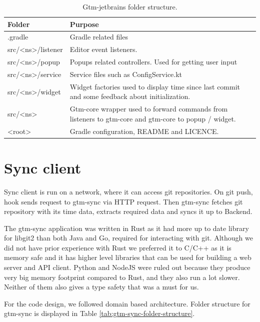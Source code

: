 \begin{table}[h]
    \centering
    \begin{tabular}{ | p{3cm} | p{10cm} |}
        \hline
        Folder & Purpose\\
        \hline
        .gradle & Gradle related files\\
        \hline
        src/<ns>/listener & Editor event listeners.\\
        \hline
        src/<ns>/popup & Popups related controllers.
        Used for getting user input\\
        \hline
        src/<ns>/service & Service files such as ConfigService.kt\\
        \hline
        src/<ns>/widget & Widget factories used to display time since last commit and some feedback about initialization.\\
        \hline
        src/<ns> & Gtm-core wrapper used to forward commands from listeners to gtm-core and gtm-core to popup / widget.\\
        \hline
        <root> & Gradle configuration, README and LICENCE.\\
        \hline
    \end{tabular}
    \caption{Gtm-jetbrains folder structure.}
    \label{tab:gtm-jetbrains-folder-structure}
\end{table}

\section{Sync client}\label{sec:sync-client}
Sync client is run on a network, where it can access git repositories.
On git push, hook sends request to gtm-sync via HTTP request.
Then gtm-sync fetches git repository with its time data, extracts required data and syncs it up to Backend.

The gtm-sync application was written in Rust as it had more up to date library for libgit2 than both Java and Go, required for interacting with git.
Although we did not have prior experience with Rust we preferred it to C/C++ as it is memory safe and it has higher level libraries that can be
used for building a web server and API client.
Python and NodeJS were ruled out because they produce very big memory footprint compared to Rust, and they also run a lot slower.
Neither of them also gives a type safety that was a must for us.

For the code design, we followed domain based architecture.
Folder structure for gtm-sync is displayed in Table
\ref{tab:gtm-sync-folder-structure}.

